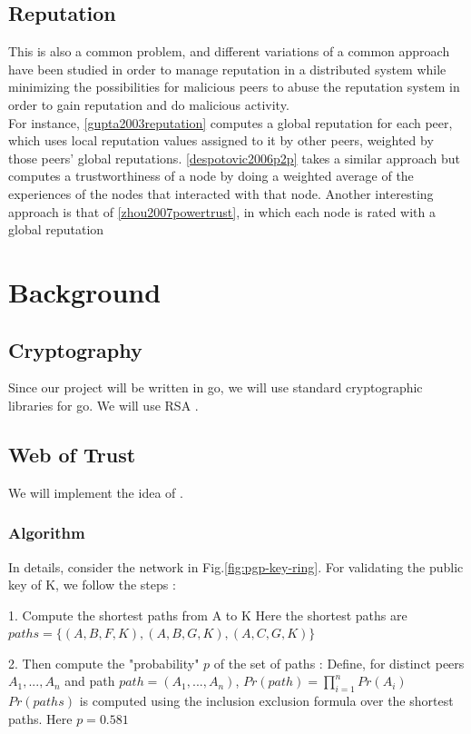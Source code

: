 \documentclass[]{article}
\begin{document}
\subsection{Reputation}
This is also a common problem, and different variations of a common approach have been studied in order to manage reputation in a distributed system while minimizing the possibilities for malicious peers to abuse the reputation system in order to gain reputation and do malicious activity.
\\
For instance, \ref{gupta2003reputation} computes a global reputation for each peer, which uses local reputation values assigned to it by other peers, weighted by those peers' global reputations.
\ref{despotovic2006p2p} takes a similar approach but computes a trustworthiness of a node by doing a weighted average of the experiences of the nodes that interacted with that node.
Another interesting approach is that of \ref{zhou2007powertrust}, in which each node is rated with a global reputation

\section{Background}
\label{sec:background}

\subsection{Cryptography}
Since our project will be written in go, we will use standard cryptographic libraries for go. We will use RSA \cite{RFC8017}.

\subsection{Web of Trust}
\label{sec:web-of-trust-spec}
We will implement the idea of \cite{haenni2007new}.

\subsubsection{Algorithm}
In details, consider the network in Fig.\ref{fig:pgp-key-ring}. For validating the public key of K, we follow the steps :

1. Compute the shortest paths from A to K \newline
Here the shortest paths are $paths = \{(A,B,F,K), (A,B,G,K), (A,C,G,K)\}$

2. Then compute the "probability" $p$ of the set of paths : \newline
Define, for distinct peers $A_1,...,A_n$ and path $path = (A_1,...,A_n)$, $Pr(path) = \prod_{i = 1}^{n} Pr(A_i)$ \newline
$Pr(paths)$ is computed using the inclusion exclusion formula over the shortest paths. \newline
Here $p = 0.581$
\end{document}
